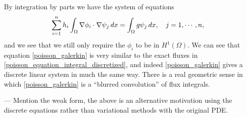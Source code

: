 By integration by parts we have the system of equations
\begin{equation}\label{poisson_galerkin}
    \sum_{i=1}^n h_i\int_{{\Omega}} \nabla \phi_i \cdot \nabla \psi_j\,dx = \int_{{\Omega}} g\psi_j\,dx,\quad j=1,\cdots,n,
\end{equation}
and we see that we still only require the $\phi_i$ to be in $H^1(\Omega)$.
We can see that equation \eqref{poisson_galerkin} is very similar to the exact fluxes in \eqref{poisson_equation_integral_discretized},
and indeed \eqref{poisson_galerkin} gives a discrete linear system in much the same way.
There is a real geometric sense in which \eqref{poisson_galerkin} is a ``blurred convolution'' of flux integrals.

--- Mention the weak form, the above is an alternative motivation using the discrete equations rather than
variational methods with the original PDE.

